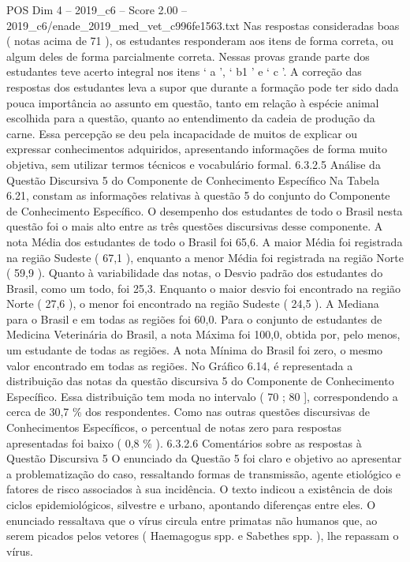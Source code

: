\begin{textsample}{POS Dim 4 – 2019\_c6 – Score 2.00 – 2019\_c6/enade\_2019\_med\_vet\_c996fe1563.txt}
Nas respostas consideradas boas ( notas acima de 71 ), os estudantes responderam aos itens de forma correta, ou algum deles de forma parcialmente correta.
Nessas provas grande parte dos estudantes teve acerto integral nos itens ‘ a ’, ‘ b1 ’ e ‘ c ’.
A correção das respostas dos estudantes leva a supor que durante a formação pode ter sido dada pouca importância ao assunto em questão, tanto em relação à espécie animal escolhida para a questão, quanto ao entendimento da cadeia de produção da carne.
Essa percepção se deu pela incapacidade de muitos de explicar ou expressar conhecimentos adquiridos, apresentando informações de forma muito objetiva, sem utilizar termos técnicos e vocabulário formal. 6.3.2.5 Análise da Questão Discursiva 5 do Componente de Conhecimento Específico Na Tabela 6.21, constam as informações relativas à questão 5 do conjunto do Componente de Conhecimento Específico.
O desempenho dos estudantes de todo o Brasil nesta questão foi o mais alto entre as três questões discursivas desse componente.
A nota Média dos estudantes de todo o Brasil foi 65,6.
A maior Média foi registrada na região Sudeste ( 67,1 ), enquanto a menor Média foi registrada na região Norte ( 59,9 ).
Quanto à variabilidade das notas, o Desvio padrão dos estudantes do Brasil, como um todo, foi 25,3.
Enquanto o maior desvio foi encontrado na região Norte ( 27,6 ), o menor foi encontrado na região Sudeste ( 24,5 ).
A Mediana para o Brasil e em todas as regiões foi 60,0.
Para o conjunto de estudantes de Medicina Veterinária do Brasil, a nota Máxima foi 100,0, obtida por, pelo menos, um estudante de todas as regiões.
A nota Mínima do Brasil foi zero, o mesmo valor encontrado em todas as regiões.
No Gráfico 6.14, é representada a distribuição das notas da questão discursiva 5 do Componente de Conhecimento Específico.
Essa distribuição tem moda no intervalo ( 70 ; 80 ], correspondendo a cerca de 30,7 \% dos respondentes.
Como nas outras questões discursivas de Conhecimentos Específicos, o percentual de notas zero para respostas apresentadas foi baixo ( 0,8 \% ). 6.3.2.6 Comentários sobre as respostas à Questão Discursiva 5 O enunciado da Questão 5 foi claro e objetivo ao apresentar a problematização do caso, ressaltando formas de transmissão, agente etiológico e fatores de risco associados à sua incidência.
O texto indicou a existência de dois ciclos epidemiológicos, silvestre e urbano, apontando diferenças entre eles.
O enunciado ressaltava que o vírus circula entre primatas não humanos que, ao serem picados pelos vetores ( Haemagogus spp. e Sabethes spp. ), lhe repassam o vírus.

\end{textsample}
